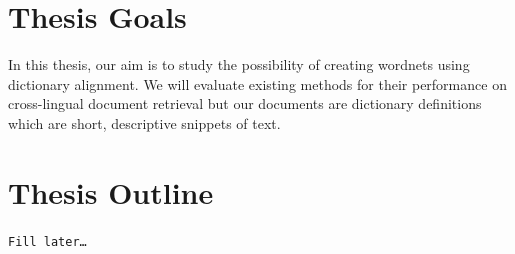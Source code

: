 \section{Thesis Goals}%
\label{sec:thesis_goals}
In this thesis, our aim is to study the possibility of creating wordnets using dictionary alignment.
We will evaluate existing methods for their performance on cross-lingual document retrieval but our documents are dictionary definitions which are short, descriptive snippets of text.

\section{Thesis Outline}%
\label{sec:thesis_outline}
\texttt{Fill later\ldots}
